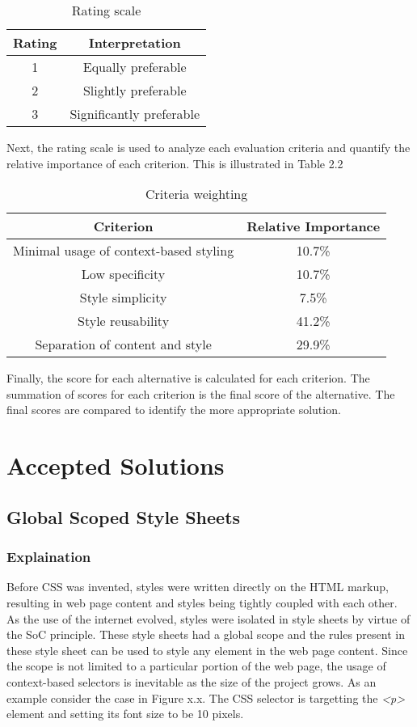 \documentclass[12pt]{article}
\begin{document}
\begin{table}[h]
	\centering
	\begin{tabular}{|c|c|}
		\hline
		\textbf{Rating} & \textbf{Interpretation} \\ 
		\hline
		1 & Equally preferable \\
		\hline 
		2 & Slightly preferable \\
		\hline
		3 & Significantly preferable \\
		\hline
	\end{tabular}
	\caption{Rating scale}
\end{table}

Next, the rating scale is used to analyze each evaluation criteria and quantify the relative importance of each criterion. This is illustrated in Table 2.2

\begin{table}[h]
	\centering
	\begin{tabular}{|c|c|}
		\hline
		\textbf{Criterion} & \textbf{Relative Importance} \\ 
		\hline
		Minimal usage of context-based styling & 10.7\% \\
		\hline 
		Low specificity & 10.7\% \\
		\hline
		Style simplicity & 7.5\% \\
		\hline
		Style reusability & 41.2\% \\
		\hline
		Separation of content and style & 29.9\% \\
		\hline
	\end{tabular}
	\caption{Criteria weighting}
\end{table}

Finally, the score for each alternative is calculated for each criterion. The summation of scores for each criterion is the final score of the alternative. The final scores are compared to identify the more appropriate solution.

\newpage

\section{Accepted Solutions}
\subsection{Global Scoped Style Sheets}
\subsubsection{Explaination}
Before CSS was invented, styles were written directly on the HTML markup, resulting in web page content and styles being tightly coupled with each other. As the use of the internet evolved, styles were isolated in style sheets by virtue of the SoC principle. These style sheets had a global scope and the rules present in these style sheet can be used to style any element in the web page content. Since the scope is not limited to a particular portion of the web page, the usage of context-based selectors is inevitable as the size of the project grows. As an example consider the case in Figure x.x. The CSS selector is targetting the \textit{<p>} element and setting its font size to be 10 pixels.
\end{document}
